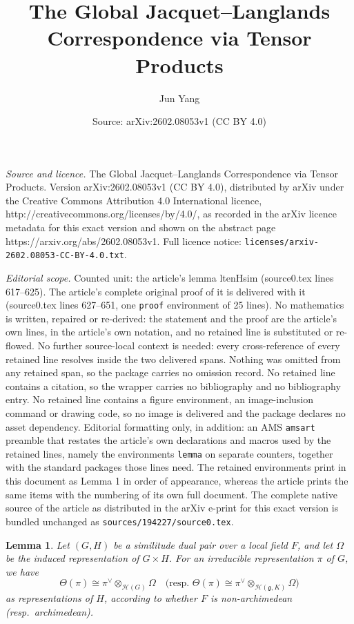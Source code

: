 \documentclass[10pt,a4paper]{amsart}
\title{The Global Jacquet--Langlands Correspondence via Tensor Products}
\author{Jun Yang}
\date{Source: arXiv:2602.08053v1 (CC BY 4.0)}
\newtheorem{lemma}{Lemma}
\begin{document}
\maketitle

\noindent\emph{Source and licence.} The Global Jacquet--Langlands Correspondence via Tensor Products. Version arXiv:2602.08053v1 (CC BY 4.0), distributed by arXiv under the Creative Commons Attribution 4.0 International licence, http://creativecommons.org/licenses/by/4.0/, as recorded in the arXiv licence metadata for this exact version and shown on the abstract page https://arxiv.org/abs/2602.08053v1. Full licence notice: \texttt{licenses/arxiv-2602.08053-CC-BY-4.0.txt}.\par\smallskip

\noindent\textit{Editorial scope.} Counted unit: the article's lemma ltenHsim (source0.tex lines 617--625). The article's complete original proof of it is delivered with it (source0.tex lines 627--651, one \texttt{proof} environment of 25 lines). No mathematics is written, repaired or re-derived: the statement and the proof are the article's own lines, in the article's own notation, and no retained line is substituted or re-flowed.  No further source-local context is needed: every cross-reference of every retained line resolves inside the two delivered spans.  Nothing was omitted from any retained span, so the package carries no omission record.  No retained line contains a citation, so the wrapper carries no bibliography and no bibliography entry.  No retained line contains a figure environment, an image-inclusion command or drawing code, so no image is delivered and the package declares no asset dependency.  Editorial formatting only, in addition: an AMS \texttt{amsart} preamble that restates the article's own declarations and macros used by the retained lines, namely the environments \texttt{lemma} on separate counters, together with the standard packages those lines need.  The retained environments print in this document as Lemma 1 in order of appearance, whereas the article prints the same items with the numbering of its own full document.  The complete native source of the article as distributed in the arXiv e-print for this exact version is bundled unchanged as \texttt{sources/194227/source0.tex}.
\begin{lemma}\label{ltenHsim}
Let $(G,H)$ be a similitude dual pair over a local field $F$, and let $\Omega$ be the induced representation of $G\times H$.
For an irreducible representation $\pi$ of $G$, we have
\[
\Theta(\pi)\cong\pi^{\vee}\otimes_{\mathcal{H}(G)}\Omega
\quad \text{(resp.\ } \Theta(\pi)\cong\pi^{\vee}\otimes_{\mathcal{H}(\mathfrak{g},K)}\Omega\text{)}
\]
as representations of $H$, according to whether $F$ is non-archimedean (resp.\ archimedean).
\end{lemma}
\end{document}
